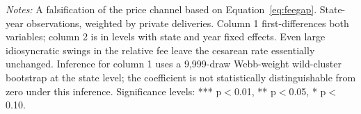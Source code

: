 
\begin{table}[H]
   \caption{\label{tab:fee_shock} \textbf{Changes in the cesarean rate and changes in the fee gap}}
   \centering
\small\setlength{\tabcolsep}{5pt}
   
   \par \raggedright 
   \footnotesize\textit{Notes:} A falsification of the price channel based on Equation~\eqref{eq:feegap}. State-year observations, weighted by private deliveries. Column 1 first-differences both variables; column 2 is in levels with state and year fixed effects. Even large idiosyncratic swings in the relative fee leave the cesarean rate essentially unchanged. Inference for column 1 uses a 9,999-draw Webb-weight wild-cluster bootstrap at the state level; the coefficient is not statistically distinguishable from zero under this inference. \footnotesize Significance levels: *** p$<$0.01, ** p$<$0.05, * p$<$0.10.
\end{table}


